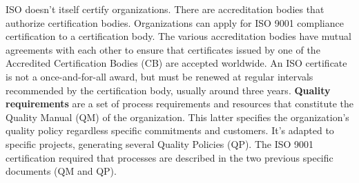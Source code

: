 ISO doesn't itself certify organizations. There are accreditation bodies that authorize certification bodies. Organizations can apply for ISO 9001 compliance certification to a certification body. The various accreditation bodies have mutual agreements with each other to ensure that certificates issued by one of the Accredited Certification Bodies (CB) are accepted worldwide. An ISO certificate is not a once-and-for-all award, but must be renewed at regular intervals recommended by the certification body, usually around three years. \textbf{Quality requirements} are a set of process requirements and resources that constitute the Quality Manual (QM) of the organization. This latter specifies the organization's quality policy regardless specific commitments and customers. It's adapted to specific projects, generating several Quality Policies (QP). The ISO 9001 certification required that processes are described in the two previous specific documents (QM and QP).
